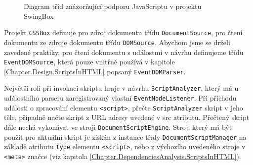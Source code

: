 \begin{figure}[H]
  \begin{center}
    \caption{Diagram tříd znázorňující podporu JavaScriptu v projektu SwingBox}
    \label{Figure.ScriptsInSwingBoxDesign}
  \end{center}
\end{figure}

Projekt \texttt{CSSBox} definuje pro zdroj dokumentu třídu \texttt{DocumentSource}, pro čtení dokumentu ze zdroje dokumentu třídu \texttt{DOMSource}. Abychom jsme se drželi zavedené praktiky, pro čtení dokumentu s událostmi v návrhu definujeme třídu \texttt{EventDOMSource}, která pouze vnitřně používá v kapitole \ref{Chapter.Design.ScriptsInHTML} popsaný \texttt{EventDOMParser}. 

Největší roli při invokaci skriptu hraje v návrhu \texttt{ScriptAnalyzer}, který má u událostního parseru zaregistrovaný vlastní \texttt{EventNodeListener}. Při příchodu události o zpracování elementu \texttt{<script>}, přečte \texttt{ScriptAnalyzer} skript v jeho těle, případně načte skript z URL adresy uvedené v src atributu. Přečtený skript dále nechá vykonávat ve stroji \texttt{DocumentScriptEngine}. Stroj, který má být použit pro aktuální skript je získán z instance třídy \texttt{DocumentScriptManager} na základě atributu \texttt{type} elementu \texttt{<script>}, nebo z výchozího uvedeného stroje v \texttt{<meta>} značce (viz kapitola \ref{Chapter.DependenciesAnalysis.ScriptsInHTML}).

